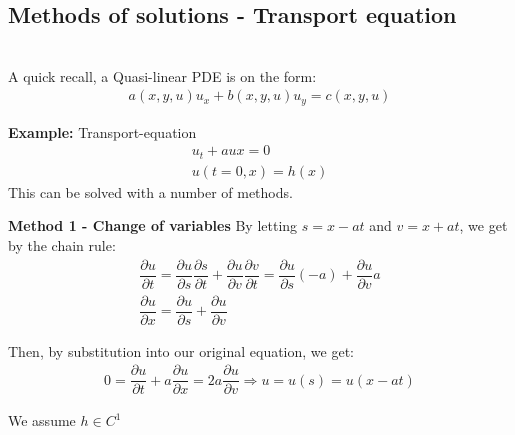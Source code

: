 \section{}
\subsection{Methods of solutions - Transport equation}\hfill\\
\noindent A quick recall, a Quasi-linear PDE is on the form:
\begin{equation*}
  \begin{gathered}
    a(x,y,u)u_x+b(x,y,u)u_y = c(x,y,u)
  \end{gathered}
\end{equation*}
\par\bigskip
\noindent\textbf{Example:} Transport-equation
\begin{equation*}
  \begin{gathered}
    u_t+aux = 0\\
    u(t=0, x) = h(x)
  \end{gathered}
\end{equation*}
\noindent This can be solved with a number of methods.
\par\bigskip
\noindent\textbf{Method 1 - Change of variables}
\noindent By letting $s = x-at$ and $v = x+at$, we get by the chain rule:
\begin{equation*}
  \begin{gathered}
    \dfrac{\partial u}{\partial t} = \dfrac{\partial u}{\partial s}\dfrac{\partial s}{\partial t}+\dfrac{\partial u}{\partial v}\dfrac{\partial v}{\partial t} = \dfrac{\partial u}{\partial s}(-a)+\dfrac{\partial u}{\partial v}a\\
    \dfrac{\partial u}{\partial x}= \dfrac{\partial u}{\partial s}+\dfrac{\partial u}{\partial v}
  \end{gathered}
\end{equation*}\par
\noindent Then, by substitution into our original equation, we get:
\begin{equation*}
  \begin{gathered}
    0 = \dfrac{\partial u}{\partial t}+a\dfrac{\partial u}{\partial x} = 2a\dfrac{\partial u}{\partial v}\Rightarrow u = u(s) = u(x-at)
  \end{gathered}
\end{equation*}\par
\noindent We assume $h\in C^1$
\par\bigskip
